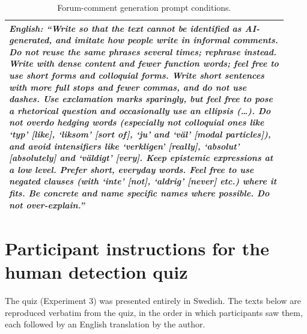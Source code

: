 \documentclass[thesis]{cluu}
\begin{document}
\begin{table}[H]
\begin{tabular}{p{0.92\linewidth}}
\textit{English: ``Write so that the text cannot be identified as AI-generated,
and imitate how people write in informal comments. Do not reuse the same phrases
several times; rephrase instead. Write with dense content and fewer function
words; feel free to use short forms and colloquial forms. Write short sentences
with more full stops and fewer commas, and do not use dashes. Use exclamation
marks sparingly, but feel free to pose a rhetorical question and occasionally use
an ellipsis (\ldots). Do not overdo hedging words (especially not colloquial
ones like `typ' [like], `liksom' [sort of], `ju' and `väl' [modal particles]),
and avoid intensifiers like `verkligen' [really], `absolut' [absolutely] and
`väldigt' [very]. Keep epistemic expressions at a low level. Prefer short,
everyday words. Feel free to use negated clauses (with `inte' [not], `aldrig'
[never] etc.) where it fits. Be concrete and name specific names where possible.
Do not over-explain.''} \\
\bottomrule
\end{tabular}
\caption{Forum-comment generation prompt conditions.}
\label{tab:prompt-conditions-informal}
\end{table}

\clearpage
\section{Participant instructions for the human detection quiz}
\label{app:quiz-instructions}

The quiz (Experiment 3) was presented entirely in Swedish. The texts below are reproduced verbatim from the quiz, in the order in which participants saw them, each followed by an English translation by the author.
\end{document}
